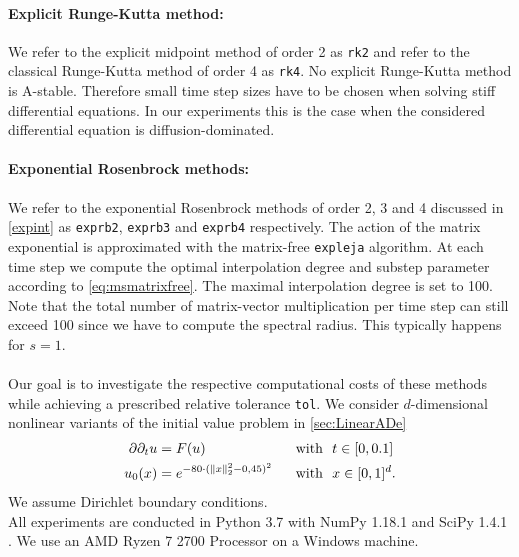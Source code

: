 \documentclass{scrartcl}
\begin{document}
	\paragraph{Explicit Runge-Kutta method:}
	We refer to the explicit midpoint method of order 2 as \texttt{rk2} and refer to the classical Runge-Kutta method of order 4 as \texttt{rk4}. No explicit Runge-Kutta method is A-stable. Therefore small time step sizes have to be chosen when solving stiff differential equations. In our experiments this is the case when the considered differential equation is diffusion-dominated.
	
	\paragraph{Exponential Rosenbrock methods:}
	We refer to the exponential Rosenbrock methods of order 2, 3 and 4 discussed in \ref{expint} as \texttt{exprb2}, \texttt{exprb3} and \texttt{exprb4} respectively.
	The action of the matrix exponential is approximated with the matrix-free \texttt{expleja} algorithm. At each time step we compute the optimal interpolation degree and substep parameter according to \eqref{eq:msmatrixfree}.
	The maximal interpolation degree is set to 100. Note that the total number of matrix-vector multiplication per time step can still exceed 100 since we have to compute the spectral radius. This typically happens for $s=1$. \\
	\\
	Our goal is to investigate the respective computational costs of these methods while achieving a prescribed relative tolerance \texttt{tol}.
	We consider $d$-dimensional nonlinear variants of the initial value problem in \ref{sec:LinearADe}
	\begin{alignat*}
		\partial\partial_tu &= F(u) &&~~\text{with}~~ t\in[0,0.1] \\
		u_0(x) &= e^{-80\cdot(\norm{x}_2^2-0,45)^2} &&~~\text{with}~~ x\in[0,1]^d.
	\end{alignat*}
	We assume Dirichlet boundary conditions. \\
	All experiments are conducted in Python 3.7 \cite{python} with NumPy 1.18.1 \cite{numpy} and SciPy 1.4.1 \cite{numpy}. We use an AMD Ryzen 7 2700 Processor on a Windows machine. 
	
\end{document}
